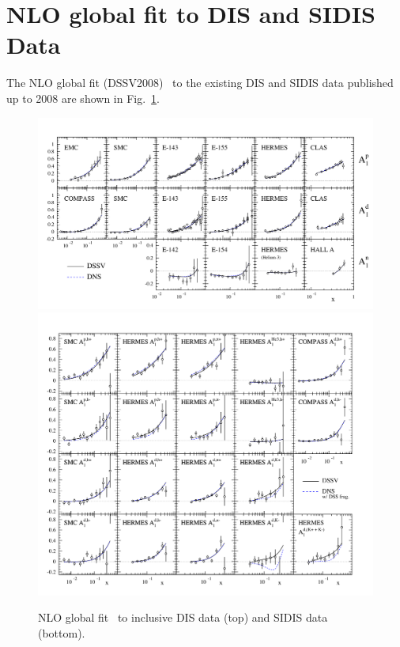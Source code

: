 \section{NLO global fit to DIS and SIDIS Data}
 The NLO global fit (DSSV2008)~\cite{DSSV2008} to the existing DIS and SIDIS data published up to 2008  are shown in Fig.~\ref{fig:sasnlo}. 
\begin{figure}[htbp]
\vspace{-1.0cm}
  \centering
    \includegraphics[width=0.90\linewidth]{./figs_xj/sassot_disnlo.pdf} \\
\vspace{-0.2cm}
    \includegraphics[width=0.90\linewidth]{./figs_xj/sassot_sidisnlo.pdf}
\caption{\label{fig:sasnlo} NLO global fit~\protect\cite{DSSV2008} 
to inclusive DIS data (top) and SIDIS data (bottom). 
}
\end{figure}


